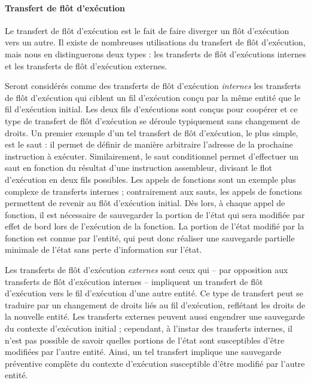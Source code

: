 		\paragraph{Transfert de flôt d'exécution}
		\label{sec:transfer_def}

			Le transfert de flôt d'exécution est le fait de faire diverger un flôt d'exécution vers un autre. Il existe de nombreuses utilisations du transfert de flôt d'exécution, mais nous en distinguerons deux types : les transferts de flôt d'exécutions internes et les transferts de flôt d'exécution externes.

			Seront considérés comme des transferts de flôt d'exécution \emph{internes} les transferts de flôt d'exécution qui ciblent un fil d'exécution conçu par la même entité que le fil d'exécution  initial. Les deux fils d'exécutions sont conçus pour coopérer et ce type de transfert de flôt d'exécution se déroule typiquement sans changement de droits. Un premier exemple d'un tel transfert de flôt d'exécution, le plus simple, est le saut : il permet de définir de manière arbitraire l'adresse de la prochaine instruction à exécuter. Similairement, le saut conditionnel permet d'effectuer un saut en fonction du résultat d'une instruction assembleur, divisant le flot d'exécution en deux fils possibles. Les appels de fonctions sont un exemple plus complexe de transferts internes ; contrairement aux sauts, les appels de fonctions permettent de revenir au flôt d'exécution initial. Dès lors, à chaque appel de fonction, il est nécessaire de sauvegarder la portion de l'état qui sera modifiée par effet de bord lors de l'exécution de la fonction.  La portion de l'état modifié par la fonction est connue par l'entité, qui peut donc réaliser une sauvegarde partielle minimale de l'état sans perte d'information sur l'état.

			Les transferts de flôt d'exécution \emph{externes} sont ceux qui -- par opposition aux transferts de flôt d'exécution internes -- impliquent un transfert de flôt d'exécution vers le fil d'exécution d'une autre entité. Ce type de transfert peut se traduire par un changement de droits liés au fil d'exécution, reflétant les droits de la nouvelle entité. Les transferts externes peuvent aussi engendrer une sauvegarde du contexte d'exécution initial ; cependant, à l'instar des transferts internes, il n'est pas possible de savoir quelles portions de l'état sont susceptibles d'être modifiées par l'autre entité. Ainsi, un tel transfert implique une sauvegarde préventive complète du contexte d'exécution susceptible d'être modifié par l'autre entité.

